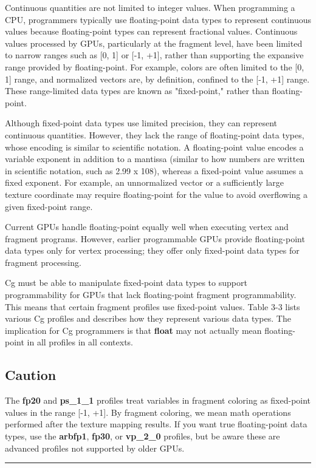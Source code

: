 \documentclass{book}
\begin{document}
Continuous quantities are not limited to integer values. When programming a CPU, programmers typically use floating-point data types to represent continuous values because floating-point types can represent fractional values. Continuous values processed by GPUs, particularly at the fragment level, have been limited to narrow ranges such as [0, 1] or [-1, +1], rather than supporting the expansive range provided by floating-point. For example, colors are often limited to the [0, 1] range, and normalized vectors are, by definition, confined to the [-1, +1] range. These range-limited data types are known as "fixed-point," rather than floating-point.

Although fixed-point data types use limited precision, they can represent continuous quantities. However, they lack the range of floating-point data types, whose encoding is similar to scientific notation. A floating-point value encodes a variable exponent in addition to a mantissa (similar to how numbers are written in scientific notation, such as 2.99 x 108), whereas a fixed-point value assumes a fixed exponent. For example, an unnormalized vector or a sufficiently large texture coordinate may require floating-point for the value to avoid overflowing a given fixed-point range.

Current GPUs handle floating-point equally well when executing vertex and fragment programs. However, earlier programmable GPUs provide floating-point data types only for vertex processing; they offer only fixed-point data types for fragment processing.

Cg must be able to manipulate fixed-point data types to support programmability for GPUs that lack floating-point fragment programmability. This means that certain fragment profiles use fixed-point values. Table 3-3 lists various Cg profiles and describes how they represent various data types. The implication for Cg programmers is that \textbf{float} may not actually mean floating-point in all profiles in all contexts.

\subsection*{Caution}

The \textbf{fp20} and \textbf{ps_1_1} profiles treat variables in fragment coloring as fixed-point values in the range [-1, +1]. By fragment coloring, we mean math operations performed after the texture mapping results. If you want true floating-point data types, use the \textbf{arbfp1}, \textbf{fp30}, or \textbf{vp_2_0} profiles, but be aware these are advanced profiles not supported by older GPUs.
\hrule
\end{document}
